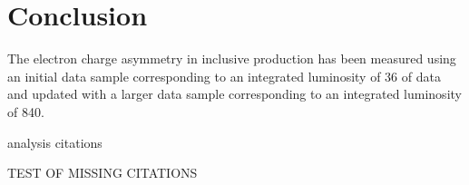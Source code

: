\chapter{Conclusion}
\label{chap:conclusion}

The electron charge asymmetry in inclusive \PW production has been measured
using an initial data sample corresponding to an integrated luminosity of
\unit{36}{\invpb} of data and updated with a larger data sample corresponding to
an integrated luminosity of \unit{840}{\inpb}.








analysis citations
\cite{asym36}
\cite{code}
\cite{baisini2010electron}
\cite{monchenault2011predictions}
\cite{majumder2010muon}



TEST OF MISSING CITATIONS
\cite{t1972regularization}
\cite{glashow1961partial}
\cite{weinberg1967model}
\cite{salam1968weak}
\cite{englert1964broken}
\cite{higgs1981broken}
\cite{guralnik1964global}
\cite{chatrchyan2012observation}
\cite{aad2012observation}
\cite{aitchison2004gauge}
\cite{halzen1984quarks}
\cite{griffiths2008introduction}
\cite{perkins2000introduction}
\cite{ral}
\cite{martin}
\cite{kom}
\cite{catani}
\cite{martin2009parton}
\cite{lai2010vv}
\cite{Lionetti:2011pw}
\cite{aaron2010combined}
\cite{campbellmcfm}
\cite{hepdata}
\cite{Bourilkov:2006cj}
\cite{cdfWAsym}
\cite{d0WAsym}
\cite{lhc}
\cite{myers1990design}
\cite{intlumi}
\cite{chatrchyan2008cms}
\cite{SketchUpCMSGallery}
\cite{ecal1997technical}
\cite{grandi2004cms}
\cite{aad2008atlas}
\cite{alves2008lhcb}
\cite{aamodt2008alice}
\cite{adriani2008lhcf}
\cite{anelli2008totem}
\cite{myers2010lhc}
\cite{lebrun2009sector}
\cite{froidevaux2006general}
\cite{campbell2006hard}
\cite{baffioni2007electron}
\cite{adam2009electron}
\cite{meschi2001electron}
\cite{simplecutbasedeleid}
\cite{nikos}
\cite{daskalakis2009data}
\cite{baffioni2009identification}
\cite{gsf}
\cite{cmsgsf}
\cite{kalman}
\cite{PF}
\cite{bethe}
\cite{barge2009conversion}
\cite{collaboration2010muon}
\cite{collaboration2012tau}
\cite{asym36}
\cite{code}
\cite{baisini2010electron} 
\cite{monchenault2011predictions} 
\cite{majumder2010muon} 
\cite{adam2009tag} 
\cite{adam2007towards}
\cite{alcaraz2010updated}
\cite{asym840}
\cite{bendavid2011electron} 
\cite{Ball:2011gg}






